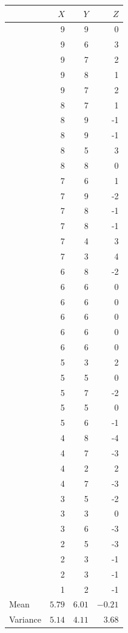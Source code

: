 \documentclass[11pt]{article}
\begin{document}
\begin{enumerate}[label=\arabic*.,leftmargin=*,itemsep=1.5em]
\newpage
\begin{center}
\begin{minipage}[t]{0.38\linewidth}
\centering
\scriptsize
\renewcommand{\arraystretch}{0.82}
\begin{tabular}{lrrr}
\toprule
 & $X$ & $Y$ & $Z$ \\
\midrule
 & 9 & 9 & 0 \\
 & 9 & 6 & 3 \\
 & 9 & 7 & 2 \\
 & 9 & 8 & 1 \\
 & 9 & 7 & 2 \\
 & 8 & 7 & 1 \\
 & 8 & 9 & -1 \\
 & 8 & 9 & -1 \\
 & 8 & 5 & 3 \\
 & 8 & 8 & 0 \\
 & 7 & 6 & 1 \\
 & 7 & 9 & -2 \\
 & 7 & 8 & -1 \\
 & 7 & 8 & -1 \\
 & 7 & 4 & 3 \\
 & 7 & 3 & 4 \\
 & 6 & 8 & -2 \\
 & 6 & 6 & 0 \\
 & 6 & 6 & 0 \\
 & 6 & 6 & 0 \\
 & 6 & 6 & 0 \\
 & 6 & 6 & 0 \\
 & 5 & 3 & 2 \\
 & 5 & 5 & 0 \\
 & 5 & 7 & -2 \\
 & 5 & 5 & 0 \\
 & 5 & 6 & -1 \\
 & 4 & 8 & -4 \\
 & 4 & 7 & -3 \\
 & 4 & 2 & 2 \\
 & 4 & 7 & -3 \\
 & 3 & 5 & -2 \\
 & 3 & 3 & 0 \\
 & 3 & 6 & -3 \\
 & 2 & 5 & -3 \\
 & 2 & 3 & -1 \\
 & 2 & 3 & -1 \\
 & 1 & 2 & -1 \\
\midrule
Mean & $5.79$ & $6.01$ & $-0.21$ \\
Variance & $5.14$ & $4.11$ & $3.68$ \\

\end{tabular}
\end{minipage}
\end{center}
\end{enumerate}
\end{document}
